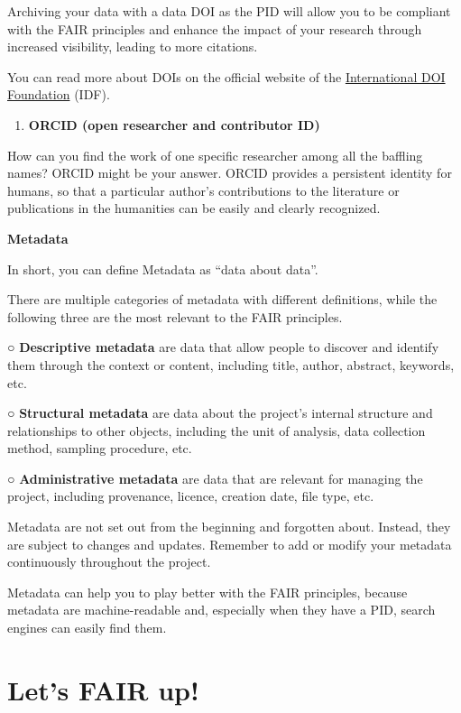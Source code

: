 \documentclass[
]{book}
\providecommand{\tightlist}{%
  \setlength{\itemsep}{0pt}\setlength{\parskip}{0pt}}
\begin{document}
Archiving your data with a data DOI as the PID will allow you to be compliant with the FAIR principles and enhance the impact of your research through increased visibility, leading to more citations.

You can read more about DOIs on the official website of the \href{https://www.doi.org/}{International DOI Foundation} (IDF).

\begin{enumerate}
\def\labelenumi{\arabic{enumi}.}
\setcounter{enumi}{1}
\tightlist
\item
  \textbf{ORCID (open researcher and contributor ID)}
\end{enumerate}

How can you find the work of one specific researcher among all the baffling names? ORCID might be your answer. ORCID provides a persistent identity for humans, so that a particular author's contributions to the literature or publications in the humanities can be easily and clearly recognized.

\textbf{Metadata}

In short, you can define Metadata as ``data about data''.

There are multiple categories of metadata with different definitions, while the following three are the most relevant to the FAIR principles.

○ \textbf{Descriptive metadata} are data that allow people to discover and identify them through the context or content, including title, author, abstract, keywords, etc.

○ \textbf{Structural metadata} are data about the project's internal structure and relationships to other objects, including the unit of analysis, data collection method, sampling procedure, etc.

○ \textbf{Administrative metadata} are data that are relevant for managing the project, including provenance, licence, creation date, file type, etc.

Metadata are not set out from the beginning and forgotten about. Instead, they are subject to changes and updates. Remember to add or modify your metadata continuously throughout the project.

Metadata can help you to play better with the FAIR principles, because metadata are machine-readable and, especially when they have a PID, search engines can easily find them.

\hypertarget{lets-fair-up}{%
\section{Let's FAIR up!}\label{lets-fair-up}}
\end{document}

